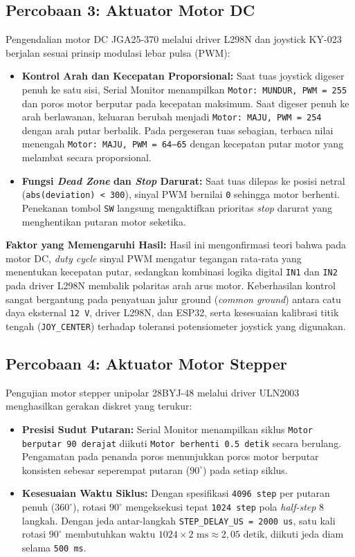 \subsection{Percobaan 3: Aktuator Motor DC}
Pengendalian motor DC JGA25-370 melalui driver L298N dan joystick KY-023 berjalan sesuai prinsip modulasi lebar pulsa (PWM):
\begin{itemize}
    \item \textbf{Kontrol Arah dan Kecepatan Proporsional:} Saat tuas joystick digeser penuh ke satu sisi, Serial Monitor menampilkan \texttt{Motor: MUNDUR, PWM = 255} dan poros motor berputar pada kecepatan maksimum. Saat digeser penuh ke arah berlawanan, keluaran berubah menjadi \texttt{Motor: MAJU, PWM = 254} dengan arah putar berbalik. Pada pergeseran tuas sebagian, terbaca nilai menengah \texttt{Motor: MAJU, PWM = 64--65} dengan kecepatan putar motor yang melambat secara proporsional.
    \item \textbf{Fungsi \textit{Dead Zone} dan \textit{Stop} Darurat:} Saat tuas dilepas ke posisi netral (\texttt{abs(deviation) < 300}), sinyal PWM bernilai \texttt{0} sehingga motor berhenti. Penekanan tombol \texttt{SW} langsung mengaktifkan prioritas \textit{stop} darurat yang menghentikan putaran motor seketika.
\end{itemize}

\textbf{Faktor yang Memengaruhi Hasil:} Hasil ini mengonfirmasi teori bahwa pada motor DC, \textit{duty cycle} sinyal PWM mengatur tegangan rata-rata yang menentukan kecepatan putar, sedangkan kombinasi logika digital \texttt{IN1} dan \texttt{IN2} pada driver L298N membalik polaritas arah arus motor. Keberhasilan kontrol sangat bergantung pada penyatuan jalur ground (\textit{common ground}) antara catu daya eksternal \texttt{12 V}, driver L298N, dan ESP32, serta kesesuaian kalibrasi titik tengah (\texttt{JOY\_CENTER}) terhadap toleransi potensiometer joystick yang digunakan.

\subsection{Percobaan 4: Aktuator Motor Stepper}
Pengujian motor stepper unipolar 28BYJ-48 melalui driver ULN2003 menghasilkan gerakan diskret yang terukur:
\begin{itemize}
    \item \textbf{Presisi Sudut Putaran:} Serial Monitor menampilkan siklus \texttt{Motor berputar 90 derajat} diikuti \texttt{Motor berhenti 0.5 detik} secara berulang. Pengamatan pada penanda poros menunjukkan poros motor berputar konsisten sebesar seperempat putaran ($90^\circ$) pada setiap siklus.
    \item \textbf{Kesesuaian Waktu Siklus:} Dengan spesifikasi \texttt{4096 step} per putaran penuh ($360^\circ$), rotasi $90^\circ$ mengeksekusi tepat \texttt{1024 step} pola \textit{half-step} 8 langkah. Dengan jeda antar-langkah \texttt{STEP\_DELAY\_US = 2000 us}, satu kali rotasi $90^\circ$ membutuhkan waktu $1024 \times 2\text{ ms} \approx 2,05\text{ detik}$, diikuti jeda diam selama \texttt{500 ms}.
\end{itemize}

